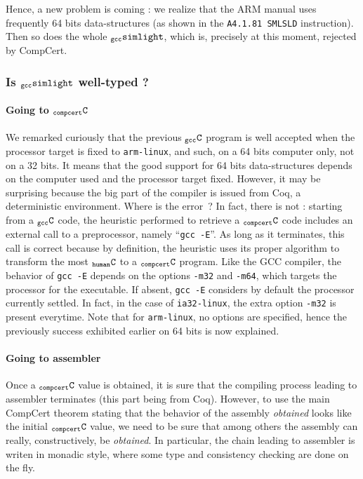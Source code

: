\documentclass[a4paper, 11pt]{article}
\newcommand{\gccSL}{$_{\tt gcc}{\tt simlight}$\xspace}
\newcommand{\C}{$_{\tt compcert}{\tt C}$\xspace}
\newcommand{\gccC}{$_{\tt gcc}{\tt C}$\xspace}
\newcommand{\hC}{$_{\tt human}{\tt C}$\xspace}
\begin{document}
Hence, a new problem is coming : we realize that the ARM manual uses frequently 64 bits data-structures (as shown in the {\tt A4.1.81 SMLSLD} instruction). Then so does the whole \gccSL, which is, precisely at this moment, rejected by CompCert.

\subsubsection{Is \gccSL well-typed ?}
\paragraph{Going to \C}
We remarked curiously that the previous \gccC program is well accepted when the processor target is fixed to \verb|arm-linux|, and such, on a 64 bits computer only, not on a 32 bits. It means that the good support for 64 bits data-structures depends on the computer used and the processor target fixed. However, it may be surprising because the big part of the compiler is issued from Coq, a deterministic environment. Where is the error~? In fact, there is not : starting from a \gccC code, the heuristic performed to retrieve a \C code includes an external call to a preprocessor, namely ``\verb|gcc -E|''. As long as it terminates, this call is correct because by definition, the heuristic uses its proper algorithm to transform the most \hC to a \C program. Like the GCC compiler, the behavior of \verb|gcc -E| depends on the options \verb|-m32| and \verb|-m64|, which targets the processor for the executable. If absent, \verb|gcc -E| considers by default the processor currently settled. In fact, in the case of \verb|ia32-linux|, the extra option \verb|-m32| is present everytime.
Note that for \verb|arm-linux|, no options are specified, hence the previously success exhibited earlier on 64 bits is now explained.

\paragraph{Going to assembler}
Once a \C value is obtained, it is sure that the compiling process leading to assembler terminates (this part being from Coq). However, to use the main CompCert theorem stating that the behavior of the assembly \emph{obtained} looks like the initial \C value, we need to be sure that among others the assembly can really, constructively, be \emph{obtained}. In particular, the chain leading to assembler is writen in monadic style, where some type and consistency checking are done on the fly. 
\end{document}
